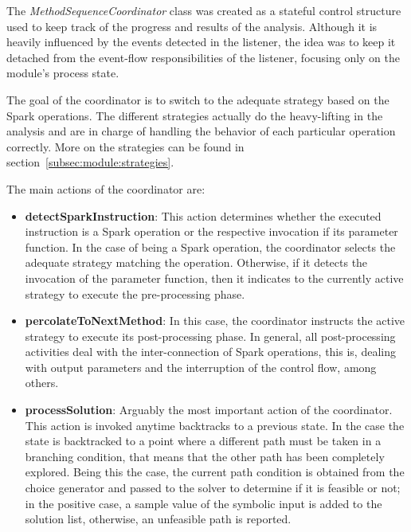 
The \textit{MethodSequenceCoordinator} class was created as a stateful control structure used to keep track of the progress and results of the analysis. Although it is heavily influenced by the events detected in the listener, the idea was to keep it detached from the event-flow responsibilities of the listener, focusing only on the module's process state.

The goal of the coordinator is to switch to the adequate strategy based on the Spark operations. The different strategies actually do the heavy-lifting in the analysis and are in charge of handling the behavior of each particular operation correctly. More on the strategies can be found in section~\ref{subsec:module:strategies}.

The main actions of the coordinator are:

\begin{itemize}
	\item \textbf{detectSparkInstruction}: This action determines whether the executed instruction is a Spark operation or the respective invocation if its parameter function. In the case of being a Spark operation, the coordinator selects the adequate strategy matching the operation. Otherwise, if it detects the invocation of the parameter function, then it indicates to the currently active strategy to execute the pre-processing phase.
	\item \textbf{percolateToNextMethod}: In this case, the coordinator instructs the active strategy to execute its post-processing phase. In general, all post-processing activities deal with the inter-connection of Spark operations, this is, dealing with output parameters and the interruption of the control flow, among others.
	\item \textbf{processSolution}: Arguably the most important action of the coordinator. This action is invoked anytime \jpf{} backtracks to a previous state. In the case the state is backtracked to a point where a different path must be taken in a branching condition, that means that the other path has been completely explored. Being this the case, the current path condition is obtained from the choice generator and passed to the solver to determine if it is feasible or not; in the positive case, a sample value of the symbolic input is added to the solution list, otherwise, an unfeasible path is reported.
\end{itemize}


